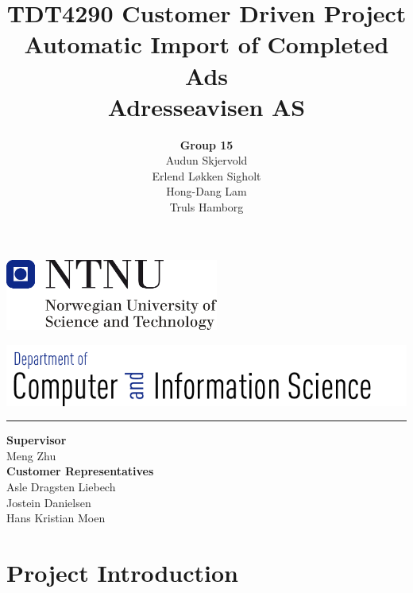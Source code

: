\documentclass[12pt, a4paper]{article}
\title{\normalsize TDT4290 Customer Driven Project \\ \LARGE \textbf{Automatic Import of Completed Ads} \normalsize \\Adresseavisen AS}
\author{\Large \textbf{Group 15} \normalsize\\Audun Skjervold \\ Erlend Løkken Sigholt \\ Hong-Dang Lam \\ Truls Hamborg}
\begin{document}
\maketitle \hspace{-0.5cm}
\begin{center}
\includegraphics[width=7cm]{images/ntnulogo}\\ 
\end{center}
\includegraphics[width=17cm]{images/idilogo}\\\hrule

\begin{center}
\textbf{Supervisor}\\ Meng Zhu\\
\textbf{Customer Representatives}\\ Asle Dragsten Liebech \\
Jostein Danielsen\\
Hans Kristian Moen\\
\end{center}
\thispagestyle{empty}
\newpage




\tableofcontents
\newpage

\listoffigures
\newpage

\listoftables
\newpage

\part{Project Introduction}









\end{document}
